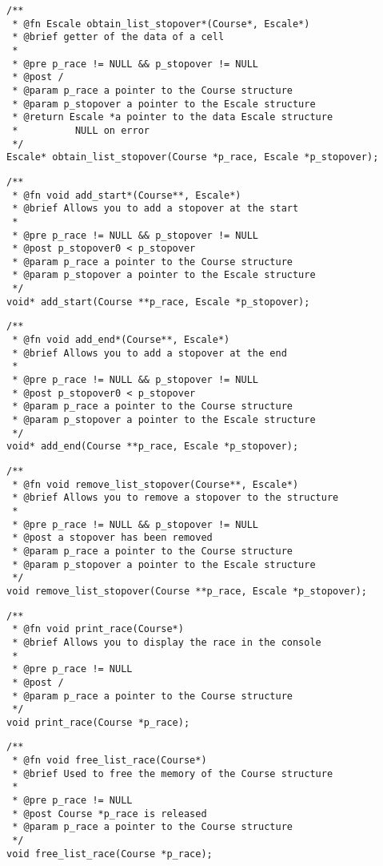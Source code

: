 \documentclass[a4paper, 11pt, oneside]{article}
\begin{document}
		\begin{lstlisting}
/**
 * @fn Escale obtain_list_stopover*(Course*, Escale*)
 * @brief getter of the data of a cell
 *
 * @pre p_race != NULL && p_stopover != NULL
 * @post /
 * @param p_race a pointer to the Course structure
 * @param p_stopover a pointer to the Escale structure
 * @return Escale *a pointer to the data Escale structure
 * 			NULL on error
 */
Escale* obtain_list_stopover(Course *p_race, Escale *p_stopover);
		\end{lstlisting}

		\begin{lstlisting}
/**
 * @fn void add_start*(Course**, Escale*)
 * @brief Allows you to add a stopover at the start
 *
 * @pre p_race != NULL && p_stopover != NULL
 * @post p_stopover0 < p_stopover
 * @param p_race a pointer to the Course structure
 * @param p_stopover a pointer to the Escale structure
 */
void* add_start(Course **p_race, Escale *p_stopover);
		\end{lstlisting}
		
		\begin{lstlisting}
/**
 * @fn void add_end*(Course**, Escale*)
 * @brief Allows you to add a stopover at the end
 *
 * @pre p_race != NULL && p_stopover != NULL
 * @post p_stopover0 < p_stopover
 * @param p_race a pointer to the Course structure
 * @param p_stopover a pointer to the Escale structure
 */
void* add_end(Course **p_race, Escale *p_stopover);
		\end{lstlisting}

		\begin{lstlisting}
/**
 * @fn void remove_list_stopover(Course**, Escale*)
 * @brief Allows you to remove a stopover to the structure
 *
 * @pre p_race != NULL && p_stopover != NULL
 * @post a stopover has been removed
 * @param p_race a pointer to the Course structure
 * @param p_stopover a pointer to the Escale structure
 */
void remove_list_stopover(Course **p_race, Escale *p_stopover);
		\end{lstlisting}
		
		\begin{lstlisting}
/**
 * @fn void print_race(Course*)
 * @brief Allows you to display the race in the console
 *
 * @pre p_race != NULL
 * @post /
 * @param p_race a pointer to the Course structure
 */
void print_race(Course *p_race);
		\end{lstlisting}
		
		\begin{lstlisting}
/**
 * @fn void free_list_race(Course*)
 * @brief Used to free the memory of the Course structure
 *
 * @pre p_race != NULL
 * @post Course *p_race is released
 * @param p_race a pointer to the Course structure
 */
void free_list_race(Course *p_race);
		\end{lstlisting}
\end{document}
